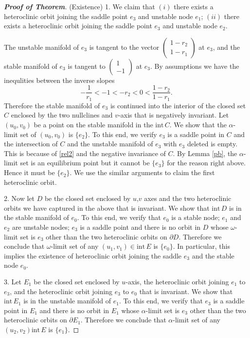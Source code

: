 \documentclass{amsart}
\theoremstyle{definition}
\numberwithin{equation}{section}
\def\ii{{\textrm{int}}\,}
\begin{document}
\begin{proof}[\textbf{Proof of Theorem}]
\bigskip
(Existence) 1. We claim that $(i)$ there exists a heteroclinic orbit joining the saddle point $e_3$ and unstable node $e_1$;  $(ii)$ there exists a heteroclinic orbit joining the saddle point $e_3$ and unstable node $e_2$. 

The unstable manifold of $e_3$ is tangent to the vector $\begin{pmatrix} 1-r_2 \\ 1-r_1 \end{pmatrix}$ at $e_3$, and the stable manifold of $e_3$ is tangent to $\begin{pmatrix} 1 \\ -1 \end{pmatrix}$ at $e_3$. By assumptions we have the inequlities between the inverse slopes
\begin{equation}\label{rel8} - \frac{1}{r_1} < -1 < - r_2 < 0 < \frac{1-r_2}{1-r_1}. \end{equation}
Therefore the stable manifold of $e_3$ is continued into the interior of the closed set $C$ enclosed by the two nullclines and $v$-axis that is negatively invariant. Let $(u_0,v_0)$ be a point on the stable manifold in the $\ii C$. We show that the $\alpha$-limit set of $(u_0,v_0)$ is $\{e_2\}$. To this end, we verify $e_3$ is a saddle point in $C$ and the intersection of $C$ and the unstable manifold of $e_3$ with $e_3$ deleted is empty. This is because of \eqref{rel2} and the negative invariance of $C$. By Lemma \ref{pb}, the $\alpha$-limit set is an equilibrium point but it cannot be $\{e_3\}$ for the reason right above. Hence it must be $\{e_2\}$. We use the similar arguments to claim the first heteroclinic orbit.

2. Now let $D$ be the closed set enclosed by $u$,$v$ axes and the two heteroclinic orbits we have captured in the above that is invariant. We show that $\ii D$ is in the stable manifold of $e_0$. To this end, we verify that $e_0$ is a stable node; $e_1$ and $e_2$ are unstable nodes; $e_3$ is a saddle point and there is no orbit in $D$ whose $\omega$-limit set is $e_3$ other than the two heteroclinic orbits on $\partial D$. Therefore we conclude that $\omega$-limit set of any $(u_1,v_1) \in \ii E$ is $\{e_0\}$. In particular, this implies the existence of heteroclinic orbit joining the saddle $e_3$ and the stable node $e_0$.

3. Let $E_1$ be the closed set enclosed by $u$-axis, the heteroclinic orbit joining $e_1$ to $e_3$, and the heteroclinic orbit joining $e_3$ to $e_0$ that is invariant. We show that $\ii E_1$ is in the unstable manifold of $e_1$. To this end, we verify that $e_3$ is a saddle point in $E_1$ and there is no orbit in $E_1$ whose $\alpha$-limit set is $e_3$ other than the two heteroclinic orbits on $\partial E_1$. Therefore we conclude that $\alpha$-limit set of any $(u_2,v_2)\ii E$ is $\{e_1\}$.


\end{proof}
\end{document}
